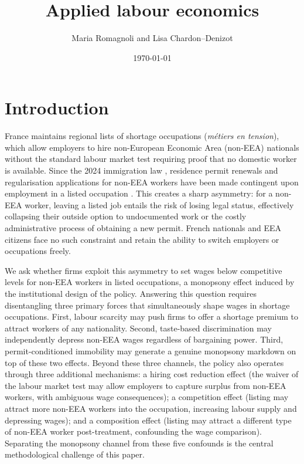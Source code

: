 \documentclass[9pt]{article}
\author{Maria Romagnoli and Lisa Chardon--Denizot}
\title{Applied labour economics}
\date{\today}
\begin{document}
\maketitle

\section{Introduction}
\label{sec:intro}


France maintains regional lists of shortage occupations (\textit{métiers en tension}),
which allow employers to hire non-European Economic Area (non-EEA) nationals without
the standard labour market test requiring proof that no domestic worker is available.
Since the 2024 immigration law \citep{ParFr2024}, residence permit renewals and
regularisation applications for non-EEA workers have been made contingent upon
employment in a listed occupation \citep{ServicePublic2025}. This creates a sharp
asymmetry: for a non-EEA worker, leaving a listed job entails the risk of losing
legal status, effectively collapsing their outside option to undocumented work or
the costly administrative process of obtaining a new permit. French nationals and
EEA citizens face no such constraint and retain the ability to switch employers or
occupations freely.

We ask whether firms exploit this asymmetry to set wages below competitive levels
for non-EEA workers in listed occupations, a monopsony effect induced by
the institutional design of the policy. Answering this question requires
disentangling three primary forces that simultaneously shape wages in shortage
occupations. First, labour scarcity may push firms to offer a shortage premium
to attract workers of any nationality. Second, taste-based discrimination may
independently depress non-EEA wages regardless of bargaining power. Third,
permit-conditioned immobility may generate a genuine monopsony markdown on top of
these two effects. Beyond these three channels, the policy also operates through
three additional mechanisms: a hiring cost reduction effect (the waiver of the
labour market test may allow employers to capture surplus from non-EEA workers, with
ambiguous wage consequences); a competition effect (listing may attract more
non-EEA workers into the occupation, increasing labour supply and depressing wages);
and a composition effect (listing may attract a different type of non-EEA
worker post-treatment, confounding the wage comparison). Separating the monopsony
channel from these five confounds is the central methodological challenge of
this paper.
\end{document}
